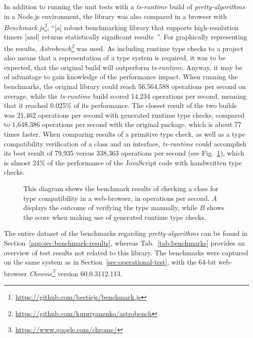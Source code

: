 In addition to running the unit tests with a \emph{ts-runtime} build of \emph{pretty-algorithms} in a Node.js environment, the library was also compared in a browser with \emph{Benchmark.js\footnote{\url{https://github.com/bestiejs/benchmark.js}}}, ``[a] robust benchmarking library that supports high-resolution timers [and] returns statistically significant results~\cite{Evaluation:benchmarkjs}''. For graphically representing the results, \emph{Astrobench\footnote{\url{https://github.com/kupriyanenko/astrobench}}} was used. As including runtime type checks to a project also means that a representation of a type system is required, it was to be expected, that the original build will outperform \emph{ts-runtime}. Anyway, it may be of advantage to gain knowledge of the performance impact. When running the benchmarks, the original library could reach 56,564,588 operations per second on average, while the \emph{ts-runtime} build scored 14,234 operations per second, meaning that it reached 0.025\% of its performance. The closest result of the two builds was 21,462 operations per second with generated runtime type checks, compared to 1,648,386 operations per second with the original package, which is about 77 times faster. When comparing results of a primitive type check, as well as a type compatibility verification of a class and an interface, \emph{ts-runtime} could accomplish its best result of 79,935 versus 338,363 operations per second (see Fig.~\ref{fig:benchmark}), which is almost 24\% of the performance of the JavaScript code with handwritten type checks.
\begin{figure}
\centering

\caption{This diagram shows the benchmark results of checking a class for type compatibility in a web-browser, in operations per second. $A$ displays the outcome of verifying the type manually, while $B$ shows the score when making use of generated runtime type checks.}
\label{fig:benchmark}
\end{figure}
The entire dataset of the benchmarks regarding \emph{pretty-algorithms} can be found in Section~\ref{app:sec:benchmark-results}, whereas Tab.~\ref{tab:benchmarks} provides an overview of test results not related to this library. The benchmarks were captured on the same system as in Section~\ref{sec:operational-test}, with the 64-bit web-browser \emph{Chrome\footnote{\url{https://www.google.com/chrome/}}} version 60.0.3112.113.
